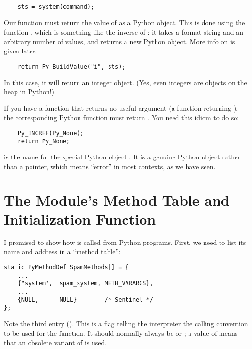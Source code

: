 \documentclass{manual}
\begin{document}
\begin{verbatim}
    sts = system(command);
\end{verbatim}

Our  function must return the value of
 as a Python object.  This is done using the function
, which is something like the inverse of
: it takes a format string and an
arbitrary number of \C{} values, and returns a new Python object.
More info on  is given later.

\begin{verbatim}
    return Py_BuildValue("i", sts);
\end{verbatim}

In this case, it will return an integer object.  (Yes, even integers
are objects on the heap in Python!)

If you have a \C{} function that returns no useful argument (a function
returning ), the corresponding Python function must return
.   You need this idiom to do so:

\begin{verbatim}
    Py_INCREF(Py_None);
    return Py_None;
\end{verbatim}

 is the \C{} name for the special Python object
.  It is a genuine Python object rather than a \NULL{}
pointer, which means ``error'' in most contexts, as we have seen.


\section{The Module's Method Table and Initialization Function}
\label{methodTable}

I promised to show how  is called from Python
programs.  First, we need to list its name and address in a ``method
table'':

\begin{verbatim}
static PyMethodDef SpamMethods[] = {
    ...
    {"system",  spam_system, METH_VARARGS},
    ...
    {NULL,      NULL}        /* Sentinel */
};
\end{verbatim}

Note the third entry ().  This is a flag telling
the interpreter the calling convention to be used for the \C{}
function.  It should normally always be  or
; a value of  means that an
obsolete variant of  is used.
\end{document}
